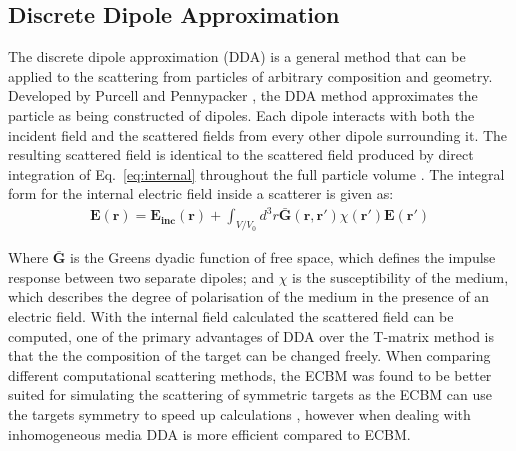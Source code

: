\subsection{Discrete Dipole Approximation}
The discrete dipole approximation (DDA) is a general method that can 
be applied to the scattering from particles of arbitrary composition
and geometry. Developed by Purcell and Pennypacker \cite{Purcell1973}, 
the DDA method approximates the particle as being constructed of dipoles.
Each dipole interacts with both the incident field and the scattered fields
from every other dipole surrounding it. The resulting scattered field is 
identical to the scattered field produced by direct integration of 
Eq.~\ref{eq:internal} throughout the full particle volume \cite{Goedecke1988}.
The integral form for the internal electric field inside a scatterer is 
given as:
\begin{align}
	\mathbf{E(r)} = \mathbf{E_{inc}(r)} + \int_{V/V_0}d^3r\mathbf{\bar{G}(r,r')}
	\chi(\mathbf{r'})\mathbf{E(r')}
\end{align}

Where $\mathbf{\bar{G}}$ is the Greens dyadic function of free space, which
defines the impulse response between two separate dipoles; and $\chi$ is the 
susceptibility of the medium, which describes the degree of polarisation of
the medium in the presence of an electric field. With the internal field 
calculated the scattered field can be computed, one of the primary advantages
of DDA over the T-matrix method is that the the composition of the target can 
be changed freely. When comparing different computational scattering methods,
the ECBM was found to be better suited for simulating the scattering of symmetric
targets as the ECBM can use the targets symmetry to speed up calculations \cite{Wriedt1998},
however when dealing with inhomogeneous media DDA is more efficient compared to
ECBM. 

